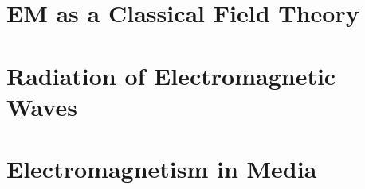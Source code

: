 \documentclass[british,11pt,a4paper]{report}
\begin{document}
\maketitle
\tableofcontents

\chapter{EM as a Classical Field Theory}

\chapter{Radiation of Electromagnetic Waves}

\chapter{Electromagnetism in Media}

\end{document}
